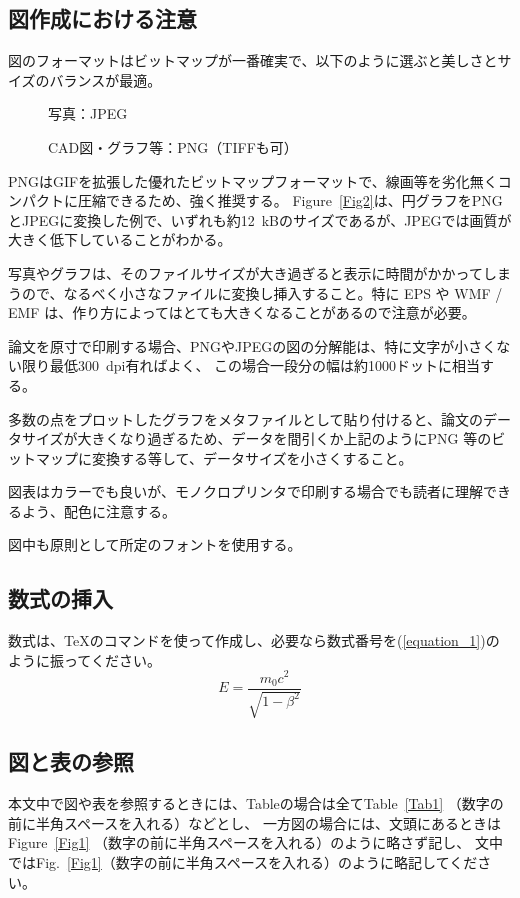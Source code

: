 \documentclass{PASJ2024}
\begin{document}
\subsection{図作成における注意}
%
\begin{Itemize}
%
\item 図のフォーマットはビットマップが一番確実で、以下のように選ぶと美しさとサイズのバランスが最適。
%
\begin{description}
\item[] 写真：JPEG
\item[] CAD図・グラフ等：PNG（TIFFも可）
\end{description}
%
\item PNGはGIFを拡張した優れたビットマップフォーマットで、線画等を劣化無くコンパクトに圧縮できるため、強く推奨する。
Figure~\ref{Fig2}は、円グラフをPNGとJPEGに変換した例で、いずれも約12~kBのサイズであるが、JPEGでは画質が大きく低下していることがわかる。
%
\item 写真やグラフは、そのファイルサイズが大き過ぎると表示に時間がかかってしまうので、なるべく小さなファイルに変換し挿入すること。特に EPS や WMF / EMF は、作り方によってはとても大きくなることがあるので注意が必要。
%
\item 論文を原寸で印刷する場合、PNGやJPEGの図の分解能は、特に文字が小さくない限り最低300~dpi有ればよく、
この場合一段分の幅は約1000ドットに相当する。
%
\item 多数の点をプロットしたグラフをメタファイルとして貼り付けると、論文のデータサイズが大きくなり過ぎるため、データを間引くか上記のようにPNG 等のビットマップに変換する等して、データサイズを小さくすること。
%
\item 図表はカラーでも良いが、モノクロプリンタで印刷する場合でも読者に理解できるよう、配色に注意する。
%
\item 図中も原則として所定のフォントを使用する。
%
\end{Itemize}
%
\subsection{数式の挿入}
数式は、{\TeX}のコマンドを使って作成し、必要なら数式番号を(\ref{equation_1})のように振ってください。
\begin{equation}
E = \frac{m_0 c^2}{\sqrt{1 - \beta^2}}
\label{equation_1}
\end{equation}
%
\subsection{図と表の参照}
本文中で図や表を参照するときには、Tableの場合は全てTable~\ref{Tab1}
（数字の前に半角スペースを入れる）などとし、
一方図の場合には、文頭にあるときはFigure~\ref{Fig1}
（数字の前に半角スペースを入れる）のように略さず記し、
文中ではFig.~\ref{Fig1}（数字の前に半角スペースを入れる）のように略記してください。
%
\end{document}

